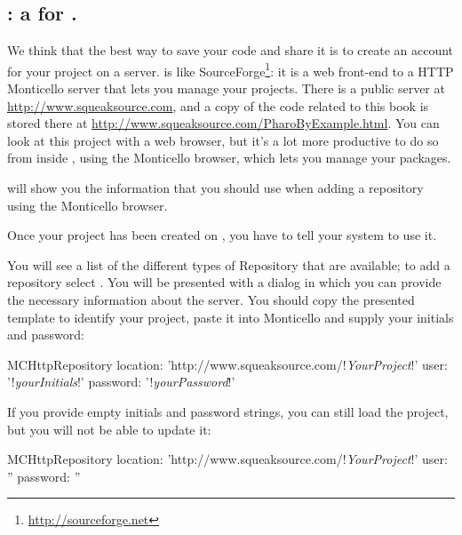 \documentclass[a4paper,10pt,twoside]{book}
\begin{document}
{

\subsection{\ind{\sqsrc}: a  for \pharo.} 
We think that the best way to save your code and share it is to create an account for your project on a \sqsrc server. 
\sqsrc is like SourceForge\footnote{\url{http://sourceforge.net}}: it is a web front-end to a HTTP Monticello server that lets you manage your projects.
There is a public \sqsrc server at \url{http://www.squeaksource.com}, and a copy of the code related to this book is stored there at \url{http://www.squeaksource.com/PharoByExample.html}. You can look at this project with a web browser, but it's a lot more productive to do so from inside \pharo, using the Monticello browser, which lets you manage your packages.

\sqsrc will show you the information that you should use when adding a repository using the Monticello browser. 

Once your project has been created on \sqsrc, you have to tell your \pharo system to use it. 

  You will see a list of the different types of Repository that are available; to add a \sqsrc repository select . You will be presented with a dialog in which you can provide the necessary information about the server.
You should copy the presented template to identify your \sqsrc project, paste it into Monticello and supply your initials and password:

\begin{code}{}
MCHttpRepository 
    location: 'http://www.squeaksource.com/!\emph{YourProject}!'
    user: '!\emph{yourInitials}!' 
    password: '!\emph{yourPassword}!'
\end{code}   

\noindent
If you provide empty initials and password strings, you can still load the project, but you will not be able to update it:

\begin{code}{}
MCHttpRepository 
    location: 'http://www.squeaksource.com/!\emph{YourProject}!'
    user: '' 
    password: ''
\end{code}   

}
\end{document}

